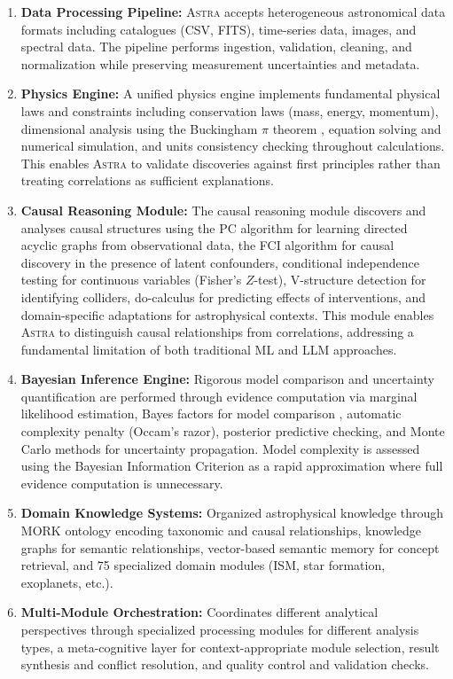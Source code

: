 \documentclass[usenatbib]{rasti}
\newcommand{\astra}{\textsc{Astra}\xspace}
\newcommand{\pc}{PC\xspace}
\newcommand{\fci}{FCI\xspace}
\begin{document}
\begin{enumerate}
  \item \textbf{Data Processing Pipeline:}
  \astra accepts heterogeneous astronomical data formats including catalogues (CSV, FITS), time-series data, images, and spectral data.
  The pipeline performs ingestion, validation, cleaning, and normalization while preserving measurement uncertainties and metadata.

  \item \textbf{Physics Engine:}
  A unified physics engine implements fundamental physical laws and constraints including conservation laws (mass, energy, momentum), dimensional analysis using the Buckingham $\pi$ theorem \citep{Buckingham1914}, equation solving and numerical simulation, and units consistency checking throughout calculations.
  This enables \astra to validate discoveries against first principles rather than treating correlations as sufficient explanations.

  \item \textbf{Causal Reasoning Module:}
  The causal reasoning module discovers and analyses causal structures using the \pc algorithm \citep{Spirtes2000} for learning directed acyclic graphs from observational data, the \fci algorithm \citep{Zhang2008} for causal discovery in the presence of latent confounders, conditional independence testing for continuous variables (Fisher's $Z$-test), V-structure detection for identifying colliders, do-calculus \citep{Pearl2009} for predicting effects of interventions, and domain-specific adaptations for astrophysical contexts.
  This module enables \astra to distinguish causal relationships from correlations, addressing a fundamental limitation of both traditional ML and LLM approaches.

  \item \textbf{Bayesian Inference Engine:}
  Rigorous model comparison and uncertainty quantification are performed through evidence computation via marginal likelihood estimation, Bayes factors for model comparison \citep{KassRaftery1995}, automatic complexity penalty (Occam's razor), posterior predictive checking, and Monte Carlo methods for uncertainty propagation.
  Model complexity is assessed using the Bayesian Information Criterion \citep[BIC;][]{Schwarz1978} as a rapid approximation where full evidence computation is unnecessary.

  \item \textbf{Domain Knowledge Systems:}
  Organized astrophysical knowledge through MORK ontology encoding taxonomic and causal relationships, knowledge graphs for semantic relationships, vector-based semantic memory for concept retrieval, and 75 specialized domain modules (ISM, star formation, exoplanets, etc.).

  \item \textbf{Multi-Module Orchestration:}
  Coordinates different analytical perspectives through specialized processing modules for different analysis types, a meta-cognitive layer for context-appropriate module selection, result synthesis and conflict resolution, and quality control and validation checks.
\end{enumerate}
\end{document}
